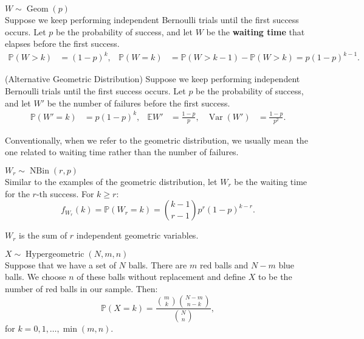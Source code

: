 \documentclass{huhtakm-template-book-v2}
\newcommand{\prob}{\mathbb{P}}
\newcommand{\expect}{\mathbb{E}}
\DeclareMathOperator{\NBin}{NBin}
\DeclareMathOperator{\Geom}{Geom}
\DeclareMathOperator{\Hypergeometric}{Hypergeometric}
\DeclareMathOperator{\Var}{Var}
\begin{document}
    \begin{eg} $W \sim \Geom(p)$\\
        Suppose we keep performing independent Bernoulli trials until the first success occurs. Let $p$ be the probability of success, and let $W$ be the \textbf{waiting time} that elapses before the first success.
        \begin{align*}
            \prob(W > k) &= (1-p)^{k}, & \prob(W = k) &= \prob(W > k-1)-\prob(W > k) = p(1-p)^{k-1}.
        \end{align*}
    \end{eg}
    \begin{eg}(Alternative Geometric Distribution)
        Suppose we keep performing independent Bernoulli trials until the first success occurs. Let $p$ be the probability of success, and let $W'$ be the number of failures before the first success.
        \begin{align*}
            \prob(W' = k) &= p(1-p)^{k}, & \expect{W'} &= \frac{1-p}{p}, & \Var(W') &= \frac{1-p}{p^{2}}.
        \end{align*}
    \end{eg}
    \begin{rem}
        Conventionally, when we refer to the geometric distribution, we usually mean the one related to waiting time rather than the number of failures.
    \end{rem}
    \begin{eg} $W_{r} \sim \NBin(r,p)$\\
        Similar to the examples of the geometric distribution, let $W_{r}$ be the waiting time for the $r$-th success. For $k \geq r$:
        \begin{equation*}
            f_{W_{r}}(k) = \prob(W_{r} = k) = \binom{k-1}{r-1}p^{r}(1-p)^{k-r}.
        \end{equation*}
    \end{eg}
    \begin{rem}
        $W_{r}$ is the sum of $r$ independent geometric variables.
    \end{rem}
    \begin{eg} $X \sim \Hypergeometric(N,m,n)$\\
        Suppose that we have a set of $N$ balls. There are $m$ red balls and $N-m$ blue balls. We choose $n$ of these balls without replacement and define $X$ to be the number of red balls in our sample. Then:
        \begin{equation*}
            \prob(X = k) = \frac{\binom{m}{k}\binom{N-m}{n-k}}{\binom{N}{n}},
        \end{equation*}
        for $k = 0,1,\dots,\min(m,n)$.
    \end{eg}
\end{document}
